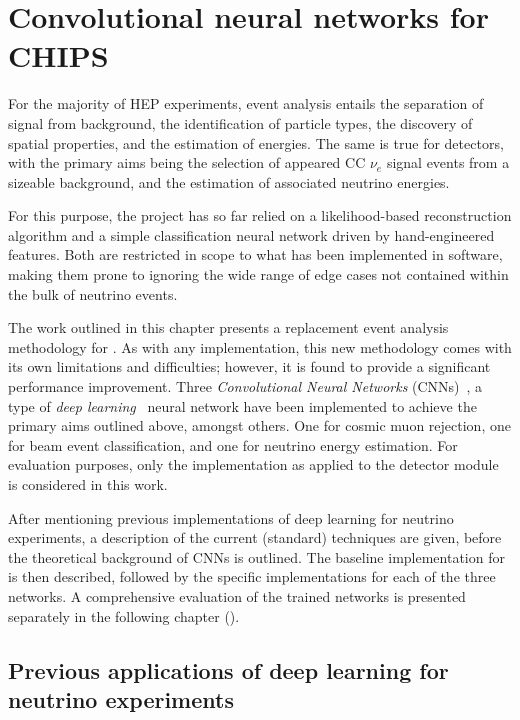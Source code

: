 \chapter{Convolutional neural networks for CHIPS} %
\label{chap:cnn} %

For the majority of HEP experiments, event analysis entails the separation of signal from
background, the identification of particle types, the discovery of spatial properties, and the
estimation of energies. The same is true for \chips detectors, with the primary aims being the
selection of appeared CC $\nu_{e}$ signal events from a sizeable background, and the estimation of
associated neutrino energies.

For this purpose, the \chips project has so far relied on a likelihood-based reconstruction
algorithm and a simple classification neural network driven by hand-engineered features. Both are
restricted in scope to what has been implemented in software, making them prone to ignoring the
wide range of edge cases not contained within the bulk of neutrino events.

The work outlined in this chapter presents a replacement event analysis methodology for \chips. As
with any implementation, this new methodology comes with its own limitations and difficulties;
however, it is found to provide a significant performance improvement. Three \emph{Convolutional
Neural Networks} (CNNs)~\cite{fukushima1982}, a type of \emph{deep learning}~\cite{goodfellow2016}
neural network have been implemented to achieve the primary aims outlined above, amongst others.
One for cosmic muon rejection, one for beam event classification, and one for neutrino energy
estimation. For evaluation purposes, only the implementation as applied to the \chipsfive detector
module is considered in this work.

After mentioning previous implementations of deep learning for neutrino experiments, a description
of the current (standard) techniques are given, before the theoretical background of CNNs is
outlined. The baseline implementation for \chips is then described, followed by the specific
implementations for each of the three networks. A comprehensive evaluation of the trained networks
is presented separately in the following chapter ().

\section{Previous applications of deep learning for neutrino experiments} %
\label{sec:cnn_previous} %

